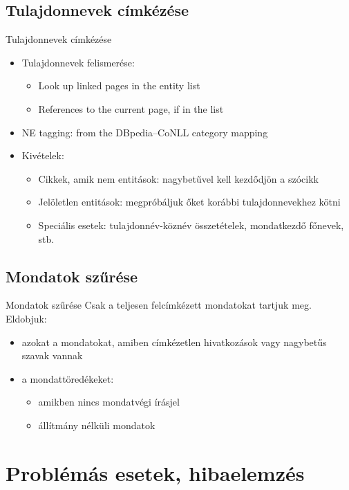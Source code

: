 \documentclass[utf8x,t]{beamer}
\newcommand{\vitem}{\item \vspace{4pt}}
\begin{document}
\subsection{Tulajdonnevek címkézése}
\begin{frame}{Tulajdonnevek címkézése}
  \bigskip
  \begin{itemize}
  \vitem Tulajdonnevek felismerése:
    \begin{itemize}
    \vitem Look up linked pages in the entity list
    \vitem References to the current page, if in the list
    \end{itemize}
  \vitem NE tagging: from the DBpedia--CoNLL category mapping
  \vitem Kivételek:
    \begin{itemize}
    \vitem Cikkek, amik nem entitások: nagybetűvel kell kezdődjön a szócikk
    \vitem Jelöletlen entitások: megpróbáljuk őket korábbi tulajdonnevekhez kötni
    \vitem Speciális esetek: tulajdonnév-köznév összetételek, mondatkezdő főnevek, stb.
    \end{itemize}
  \end{itemize}
\end{frame}

\subsection{Mondatok szűrése}
\begin{frame}{Mondatok szűrése}
  \bigskip
  Csak a teljesen felcímkézett mondatokat tartjuk meg. Eldobjuk:
  \smallskip
  \begin{itemize}
  \vitem azokat a mondatokat, amiben címkézetlen hivatkozások vagy nagybetűs szavak vannak
  \vitem a mondattöredékeket:
    \begin{itemize}
    \vitem amikben nincs mondatvégi írásjel %
    \vitem állítmány nélküli mondatok %
    \end{itemize}
  \end{itemize}
\end{frame}

\section{Problémás esetek, hibaelemzés}

\end{document}
